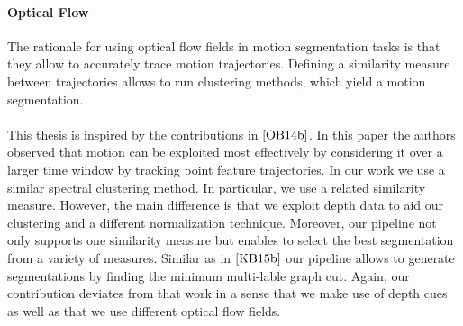 \paragraph{Optical Flow}
The rationale for using optical flow fields in motion segmentation tasks is that they allow to accurately trace motion trajectories. Defining a similarity measure between trajectories allows to run clustering methods, which yield a motion segmentation. \\ \\
This thesis is inspired by the contributions in $\cite{OB14b}$. In this paper the authors observed that motion can be exploited most effectively by considering it over a larger time window by tracking point feature trajectories. In our work we use a similar spectral clustering method. In particular, we use a related similarity measure. However, the main difference is that we exploit depth data to aid our clustering and a different normalization technique. Moreover, our pipeline not only supports one similarity measure but enables to select the best segmentation from a variety of measures. Similar as in $\cite{KB15b}$ our pipeline allows to generate segmentations by finding the minimum multi-lable graph cut. Again, our contribution deviates from that work in a sense that we make use of depth cues as well as that we use different optical flow fields.

